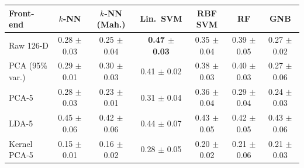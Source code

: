 \begin{tabular}{lcccccc}
\toprule
Front-end & $k$-NN & $k$-NN (Mah.) & Lin.\ SVM & RBF SVM & RF & GNB \\
\midrule
Raw 126-D & 0.28 $\pm$ 0.03 & 0.25 $\pm$ 0.04 & \textbf{0.47 $\pm$ 0.03} & 0.35 $\pm$ 0.04 & 0.39 $\pm$ 0.05 & 0.27 $\pm$ 0.02 \\
PCA (95\% var.) & 0.29 $\pm$ 0.01 & 0.30 $\pm$ 0.03 & 0.41 $\pm$ 0.02 & 0.38 $\pm$ 0.03 & 0.40 $\pm$ 0.03 & 0.27 $\pm$ 0.06 \\
PCA-5 & 0.28 $\pm$ 0.03 & 0.23 $\pm$ 0.01 & 0.31 $\pm$ 0.04 & 0.36 $\pm$ 0.04 & 0.29 $\pm$ 0.04 & 0.24 $\pm$ 0.03 \\
LDA-5 & 0.45 $\pm$ 0.06 & 0.42 $\pm$ 0.06 & 0.44 $\pm$ 0.07 & 0.43 $\pm$ 0.05 & 0.42 $\pm$ 0.05 & 0.43 $\pm$ 0.06 \\
Kernel PCA-5 & 0.15 $\pm$ 0.01 & 0.16 $\pm$ 0.02 & 0.28 $\pm$ 0.05 & 0.20 $\pm$ 0.02 & 0.21 $\pm$ 0.06 & 0.21 $\pm$ 0.03 \\
\bottomrule
\end{tabular}
